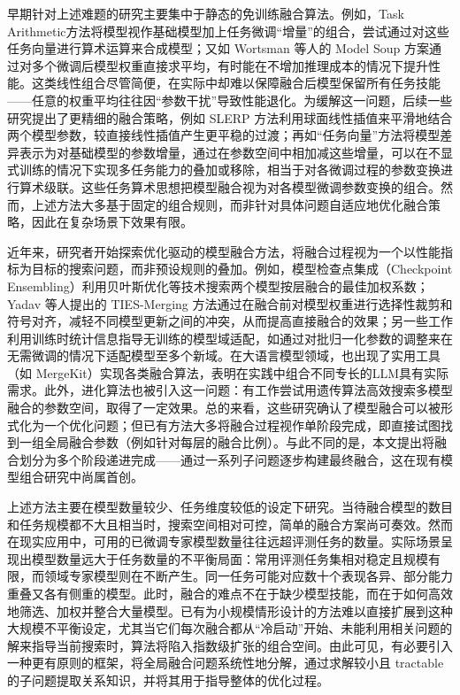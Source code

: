 \documentclass[../main.tex]{subfiles}
\begin{document}
早期针对上述难题的研究主要集中于静态的免训练融合算法。例如，Task Arithmetic方法将模型视作基础模型加上任务微调“增量”的组合，尝试通过对这些任务向量进行算术运算来合成模型；又如 Wortsman 等人的 Model Soup 方案通过对多个微调后模型权重直接求平均，有时能在不增加推理成本的情况下提升性能。这类线性组合尽管简便，在实际中却难以保障融合后模型保留所有任务技能——任意的权重平均往往因“参数干扰”导致性能退化。为缓解这一问题，后续一些研究提出了更精细的融合策略，例如 SLERP 方法利用球面线性插值来平滑地结合两个模型参数，较直接线性插值产生更平稳的过渡；再如“任务向量”方法将模型差异表示为对基础模型的参数增量，通过在参数空间中相加减这些增量，可以在不显式训练的情况下实现多任务能力的叠加或移除，相当于对各微调过程的参数变换进行算术级联。这些任务算术思想把模型融合视为对各模型微调参数变换的组合。然而，上述方法大多基于固定的组合规则，而非针对具体问题自适应地优化融合策略，因此在复杂场景下效果有限。

近年来，研究者开始探索优化驱动的模型融合方法，将融合过程视为一个以性能指标为目标的搜索问题，而非预设规则的叠加。例如，模型检查点集成（Checkpoint Ensembling）利用贝叶斯优化等技术搜索两个模型按层融合的最佳加权系数；Yadav 等人提出的 TIES-Merging 方法通过在融合前对模型权重进行选择性裁剪和符号对齐，减轻不同模型更新之间的冲突，从而提高直接融合的效果；另一些工作利用训练时统计信息指导无训练的模型域适配，如通过对批归一化参数的调整来在无需微调的情况下适配模型至多个新域。在大语言模型领域，也出现了实用工具（如 MergeKit）实现各类融合算法，表明在实践中组合不同专长的LLM具有实际需求。此外，进化算法也被引入这一问题：有工作尝试用遗传算法高效搜索多模型融合的参数空间，取得了一定效果。总的来看，这些研究确认了模型融合可以被形式化为一个优化问题；但已有方法大多将融合过程视作单阶段完成，即直接试图找到一组全局融合参数（例如针对每层的融合比例）。与此不同的是，本文提出将融合划分为多个阶段递进完成——通过一系列子问题逐步构建最终融合，这在现有模型组合研究中尚属首创。

上述方法主要在模型数量较少、任务维度较低的设定下研究。当待融合模型的数目和任务规模都不大且相当时，搜索空间相对可控，简单的融合方案尚可奏效。然而在现实应用中，可用的已微调专家模型数量往往远超评测任务的数量。实际场景呈现出模型数量远大于任务数量的不平衡局面：常用评测任务集相对稳定且规模有限，而领域专家模型则在不断产生。同一任务可能对应数十个表现各异、部分能力重叠又各有侧重的模型。此时，融合的难点不在于缺少模型技能，而在于如何高效地筛选、加权并整合大量模型。已有为小规模情形设计的方法难以直接扩展到这种大规模不平衡设定，尤其当它们每次融合都从“冷启动”开始、未能利用相关问题的解来指导当前搜索时，算法将陷入指数级扩张的组合空间。由此可见，有必要引入一种更有原则的框架，将全局融合问题系统性地分解，通过求解较小且 tractable 的子问题提取关系知识，并将其用于指导整体的优化过程。
\end{document}

